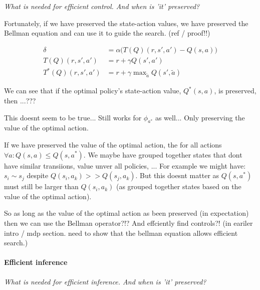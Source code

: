 \begin{displayquote}
\textit{What is needed for efficient control. And when is 'it' preserved?}
\end{displayquote}

Fortunately, if we have preserved the state-action values, we have preserved the Bellman equation and can use it to guide the search. {\color{red}(ref / proof!!)}

\begin{align*}
\delta &= \alpha \big(T(Q)(r, s', a') - Q(s, a) \big) \\
T(Q)(r, s', a') &= r + \gamma Q(s', a') \tag{SARSA} \\
T^{* }(Q)(r, s', a') &= r + \gamma \mathop{\text{max}}_{\tilde a} Q(s', \tilde a) \tag{Q-learning}
\end{align*}

We can see that if the optimal policy's state-action value, $Q^{* }(s, a)$, is preserved, then ...???

{\color{red}This doesnt seem to be true... Still works for $\phi_{a^{* }}$ as well... Only preserving the value of the optimal action.}

If we have preserved the value of the optimal action, the for all actions $\forall a: Q(s, a) \le Q(s, a^{* })$.
We maybe have grouped together states that dont have similar transiions, value unver all policies, ...
For example we might have: $s_i \sim s_j$ despite $Q(s_i, a_k) >> Q(s_j, a_k)$.
But this doesnt matter as $Q(s, a^{* })$ must still be larger than $Q(s_i, a_k)$ (as grouped together states based on the value of the optimal action).


So as long as the value of the optimal action as been preserved (in expectation) then we can use the Bellman operator?!?
And effciently find controls?!
{\color{red}(in eariler intro / mdp section. need to show that the bellman equation allows efficient search.)}

\paragraph{Efficient inference}

\begin{displayquote}
\textit{What is needed for efficient inference. And when is 'it' preserved?}
\end{displayquote}


